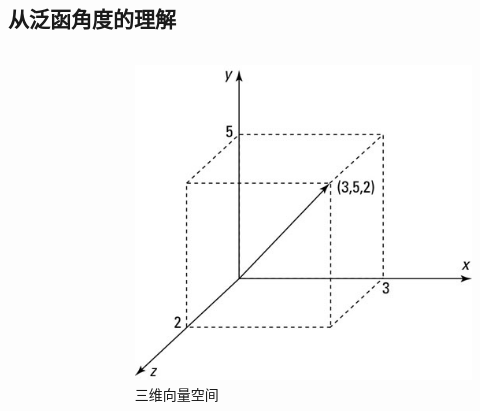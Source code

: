 \subsection{从泛函角度的理解}
\begin{frame}
    \begin{columns}
        \begin{column}{.55\textwidth}
            \begin{figure}
                \centering
                \resizebox{0.9\linewidth}{!}{}
            \end{figure}
        \end{column}

        \begin{column}{.35\textwidth}
            \begin{figure}
                \includegraphics[width=0.9\linewidth]{figure/gbdt/vector_space_3d}
                \caption{三维向量空间\footnotemark}
            \end{figure}
        \end{column}
    \end{columns}

\end{frame}

%


